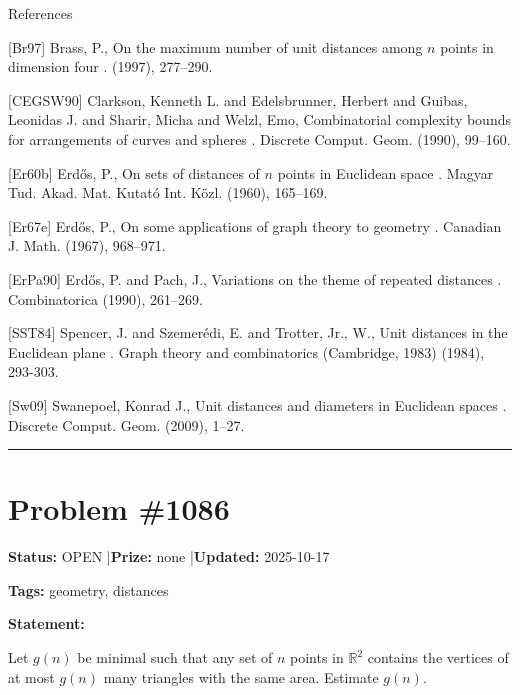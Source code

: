 \documentclass{article}
\begin{document}
References

[Br97] Brass, P., On the maximum number of unit distances among {$n$} points in dimension four . (1997), 277--290.

[CEGSW90] Clarkson, Kenneth L. and Edelsbrunner, Herbert and Guibas, Leonidas J. and Sharir, Micha and Welzl, Emo, Combinatorial complexity bounds for arrangements of curves and spheres . Discrete Comput. Geom. (1990), 99--160.

[Er60b] Erd\H{o}s, P., On sets of distances of {$n$} points in {E}uclidean space . Magyar Tud. Akad. Mat. Kutat\'o{} Int. K\"ozl. (1960), 165--169.

[Er67e] Erd\H{o}s, P., On some applications of graph theory to geometry . Canadian J. Math. (1967), 968--971.

[ErPa90] Erd\H{o}s, P. and Pach, J., Variations on the theme of repeated distances . Combinatorica (1990), 261--269.

[SST84] Spencer, J. and Szemer\'{e}di, E. and Trotter, Jr., W., Unit distances in the Euclidean plane . Graph theory and combinatorics (Cambridge, 1983) (1984), 293-303.

[Sw09] Swanepoel, Konrad J., Unit distances and diameters in {E}uclidean spaces . Discrete Comput. Geom. (2009), 1--27.

\noindent\rule{\linewidth}{0.4pt}


\section{Problem \#1086}
\label{prob:1086}

\noindent\textbf{Status:} OPEN \quad|\quad \textbf{Prize:} none \quad|\quad \textbf{Updated:} 2025-10-17

\noindent\textbf{Tags:} geometry, distances

\medskip

\noindent\textbf{Statement:}

Let $g(n)$ be minimal such that any set of $n$ points in $\mathbb{R}^2$ contains the vertices of at most $g(n)$ many triangles with the same area. Estimate $g(n)$.
\end{document}

